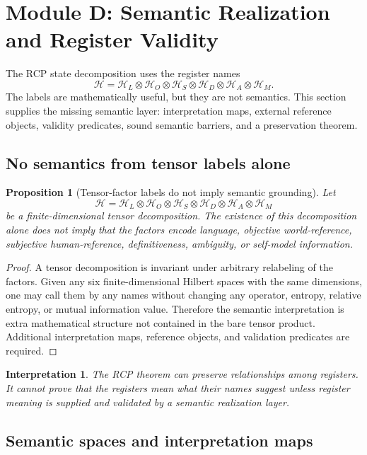 \documentclass[11pt]{article}
\newtheorem{proposition}[theorem]{Proposition}
\newtheorem{interpretation}[theorem]{Interpretation}
\newcommand{\Hcal}{\mathcal{H}}
\newcommand{\1}{\mathbf{1}}
\begin{document}
\section{Module D: Semantic Realization and Register Validity}
\label{sec:semantic_register_validity}

The RCP state decomposition uses the register names
\[
\Hcal
=
\Hcal_L\otimes\Hcal_O\otimes\Hcal_S\otimes\Hcal_D\otimes\Hcal_A\otimes\Hcal_M.
\]
The labels are mathematically useful, but they are not semantics.  This section supplies the missing semantic layer: interpretation maps, external reference objects, validity predicates, sound semantic barriers, and a preservation theorem.

\subsection{No semantics from tensor labels alone}

\begin{proposition}[Tensor-factor labels do not imply semantic grounding]
\label{prop:tensor_labels_not_semantics}
Let
\[
\Hcal
=
\Hcal_L\otimes\Hcal_O\otimes\Hcal_S\otimes\Hcal_D\otimes\Hcal_A\otimes\Hcal_M
\]
be a finite-dimensional tensor decomposition.  The existence of this decomposition alone does not imply that the factors encode language, objective world-reference, subjective human-reference, definitiveness, ambiguity, or self-model information.
\end{proposition}

\begin{proof}
A tensor decomposition is invariant under arbitrary relabeling of the factors.  Given any six finite-dimensional Hilbert spaces with the same dimensions, one may call them by any names without changing any operator, entropy, relative entropy, or mutual information value.  Therefore the semantic interpretation is extra mathematical structure not contained in the bare tensor product.  Additional interpretation maps, reference objects, and validation predicates are required.
\end{proof}

\begin{interpretation}
The RCP theorem can preserve relationships among registers.  It cannot prove that the registers mean what their names suggest unless register meaning is supplied and validated by a semantic realization layer.
\end{interpretation}

\subsection{Semantic spaces and interpretation maps}
\end{document}
